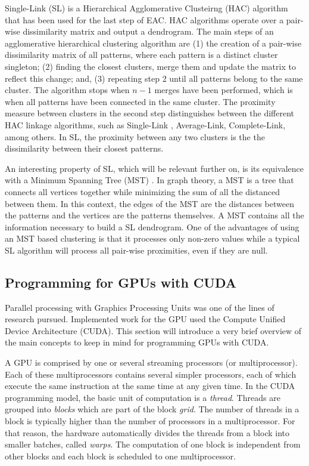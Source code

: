 Single-Link (SL) is a Hierarchical Agglomerative Clusteirng (HAC) algorithm that has been used for the last step of EAC.
HAC algorithms operate over a pair-wise dissimilarity matrix and output a dendrogram.
The main steps of an agglomerative hierarchical clustering algorithm are \cite{Jain1999} (1) the creation of a pair-wise dissimilarity matrix of all patterns, where each pattern is a distinct cluster singleton; (2) finding the closest clusters, merge them and update the matrix to reflect this change; and, (3) repeating step 2 until all patterns belong to the same cluster.
The algorithm stops when $n-1$ merges have been performed, which is when all patterns have been connected in the same cluster.
The proximity measure between clusters in the second step distinguishes between the different HAC linkage algorithms, such as Single-Link , Average-Link, Complete-Link, among others.
In SL, the proximity between any two clusters is the the dissimilarity between their closest patterns.

An interesting property of SL, which will be relevant further on, is its equivalence with a Minimum Spanning Tree (MST) \cite{Gower1969}.
In graph theory, a MST is a tree that connects all vertices together while minimizing the sum of all the distanced between them.
In this context, the edges of the MST are the distances between the patterns and the vertices are the patterns themselves.
A MST contains all the information necessary to build a SL dendrogram.
One of the advantages of using an MST based clustering is that it processes only non-zero values while a typical SL algorithm will process all pair-wise proximities, even if they are null.

\subsection{Programming for GPUs with CUDA}

Parallel processing with Graphics Processing Units was one of the lines of research pursued.
Implemented work for the GPU used the Compute Unified Device Architecture (CUDA).
This section will introduce a very brief overview of the main concepts to keep in mind for programming GPUs with CUDA.

A GPU is comprised by one or several streaming processors (or multiprocessor).
Each of these multiprocessors contains several simpler processors, each of which execute the same instruction at the same time at any given time.
In the CUDA programming model, the basic unit of computation is a \emph{thread}.
Threads are grouped into \emph{blocks} which are part of the block \emph{grid}.
The number of threads in a block is typically higher than the number of processors in a multiprocessor.
For that reason, the hardware automatically divides the threads from a block into smaller batches, called \emph{warps}.
The computation of one block is independent from other blocks and each block is scheduled to one multiprocessor. %

